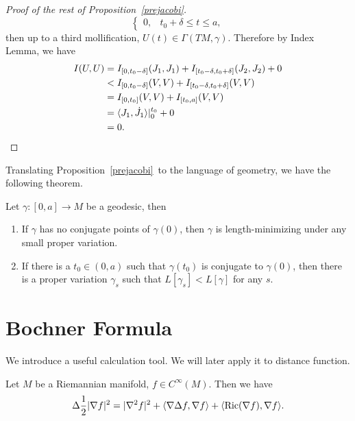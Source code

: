 \begin{proof}[Proof of the rest of Proposition~\ref{prejacobi}]
\[\begin{cases}
        0, & t_0+\delta\leq t\leq a,
    \end{cases}\]
    then up to a third mollification, $U(t)\in\Gamma(TM,\gamma)$.
    Therefore by Index Lemma, we have
    \begin{align*}
        I(U,U)&=I_{[0,t_0-\delta]}(J_1,J_1)+I_{[t_0-\delta,t_0+\delta]}(J_2,J_2)+0\\
        &<I_{[0,t_0-\delta]}(V,V)+I_{[t_0-\delta,t_0+\delta]}(V,V)\\
        &=I_{[0,t_0]}(V,V)+I_{[t_0,a]}(V,V)\\
        &=\langle J_1,\dot{J}_1\rangle|_0^{t_0}+0\\
        &=0.\qedhere
    \end{align*}
\end{proof}

Translating Proposition~\ref{prejacobi}~to the language of geometry, we have the following theorem.
\begin{thm}[Jacobi]
    Let $\gamma:[0,a]\to M$ be a geodesic, then
    \begin{enumerate}[(1)]
        \item If $\gamma$ has no conjugate points of $\gamma(0)$, then $\gamma$ is length-minimizing under any small proper variation.
        \item If there is a $t_0\in(0,a)$ such that $\gamma(t_0)$ is conjugate to $\gamma(0)$, then there is a proper variation $\gamma_s$ such that $L[\gamma_s]<L[\gamma]$ for any $s$.
    \end{enumerate}
\end{thm}

\section{Bochner Formula}
We introduce a useful calculation tool.
We will later apply it to distance function.

\begin{thm}
    Let $M$ be a Riemannian manifold, $f\in C^\infty(M)$.
    Then we have
    \[\Delta\frac{1}{2}|\nabla f|^2=|\nabla^2f|^2+\langle\nabla\Delta f,\nabla f\rangle+\langle\operatorname{Ric}(\nabla f),\nabla f\rangle.\]
\end{thm}

